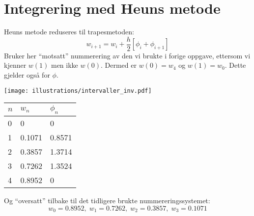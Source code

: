 \clearpage
\section{Integrering med Heuns metode} %
\label{sec:integrering_med_heuns_metode}
Heuns metode reduseres til trapesmetoden:
\begin{equation}
  w_{i+1} = w_i + \frac{h}{2} \left[ \phi_i + \phi_{i+1} \right]
\end{equation}
Bruker her ``motsatt'' nummerering av den vi brukte i forige oppgave, ettersom vi kjenner $w(1)$ men ikke $w(0)$. Dermed er $w(0)=w_4$ og $w(1)=w_0$. Dette gjelder også for $\phi$.

\texttt{[image: illustrations/intervaller\_inv.pdf]}

\begin{center}
\begin{tabular}{l|ll}
\toprule
$n$ & $w_n$ & $\phi_n$ \\
\midrule
0   & 0      & 0      \\
1   & 0.1071 & 0.8571 \\
2   & 0.3857 & 1.3714 \\
3   & 0.7262 & 1.3524 \\
4   & 0.8952 & 0      \\
\bottomrule
\end{tabular}
\end{center}
Og ``oversatt'' tilbake til det tidligere brukte nummereringssystemet:
\begin{equation}
  w_0 = 0.8952, \; w_1 = 0.7262, \; w_2 = 0.3857, \; w_3 = 0.1071 \nonumber
\end{equation}




